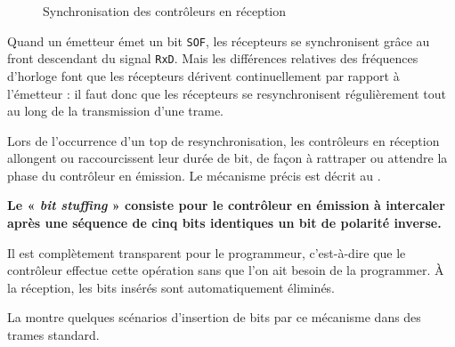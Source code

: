 \begin{figure}[h]
  \centering
  \caption{Synchronisation des contrôleurs en réception}
\end{figure}

Quand un émetteur émet un bit \texttt{SOF}, les récepteurs se synchronisent grâce au front descendant du signal \texttt{RxD}. Mais les différences relatives des fréquences d'horloge font que les récepteurs dérivent continuellement par rapport à l'émetteur : il faut donc que les récepteurs se resynchronisent régulièrement tout au long de la transmission d'une trame.

Lors de l'occurrence d'un top de resynchronisation, les contrôleurs en réception allongent ou raccourcissent leur durée de bit, de façon à rattraper ou attendre la phase du contrôleur en émission. Le mécanisme précis est décrit au .












{\bf Le « \emph{bit stuffing} » consiste pour le contrôleur en émission à intercaler après une séquence de cinq bits identiques un bit de polarité inverse.}

Il est complètement transparent pour le programmeur, c'est-à-dire que le contrôleur effectue cette opération sans que l'on ait besoin de la programmer. À la réception, les bits insérés sont automatiquement éliminés.

La  montre quelques scénarios d'insertion de bits par ce mécanisme dans des trames standard.

